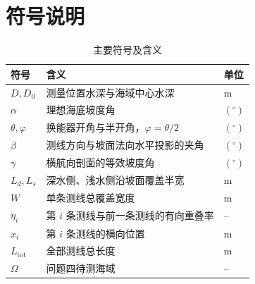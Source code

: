 \section{符号说明}
\begin{table}[H]
\centering
\caption{主要符号及含义}
\label{tab:symbols}
\begin{tabularx}{\textwidth}{C{2.2cm}LC{2.3cm}}
\toprule
符号 & 含义 & 单位 \\
\midrule
$D,D_0$ & 测量位置水深与海域中心水深 & m \\
$\alpha$ & 理想海底坡度角 & $(^\circ)$ \\
$\theta,\varphi$ & 换能器开角与半开角，$\varphi=\theta/2$ & $(^\circ)$ \\
$\beta$ & 测线方向与坡面法向水平投影的夹角 & $(^\circ)$ \\
$\gamma$ & 横航向剖面的等效坡度角 & $(^\circ)$ \\
$L_d,L_s$ & 深水侧、浅水侧沿坡面覆盖半宽 & m \\
$W$ & 单条测线总覆盖宽度 & m \\
$\eta_i$ & 第 $i$ 条测线与前一条测线的有向重叠率 & -- \\
$x_i$ & 第 $i$ 条测线的横向位置 & m \\
$L_{\mathrm{tot}}$ & 全部测线总长度 & m \\
$\Omega$ & 问题四待测海域 & -- \\
\bottomrule
\end{tabularx}
\end{table}
